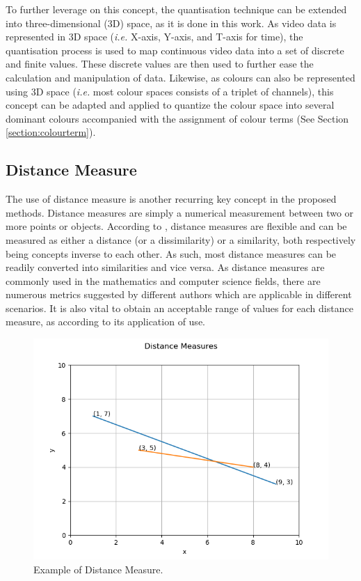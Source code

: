 To further leverage on this concept, the quantisation technique
can be extended into three-dimensional (3D) space, as it is done in this work. As video data is represented in 3D space (\emph{i.e.} X-axis, Y-axis, and T-axis for time), the quantisation process is used to map continuous video data into a set of discrete
and finite values. These discrete values are then used to further ease the
calculation and manipulation of data. Likewise, as colours can also be
represented using 3D space (\emph{i.e.} most colour spaces consists of a triplet of channels), this concept can be adapted and applied to quantize the colour space into several dominant colours accompanied
with the assignment of colour terms (See Section \ref{section:colourterm}).



\vspace{1em}
\subsection{Distance Measure}
\label{section:distancemeasures}

The use of distance measure is another recurring key concept in the proposed
methods. Distance measures are simply a numerical measurement between
two or more points or objects. According to \cite{mccune2002distance},
distance measures are flexible and can be measured as either a distance (or a dissimilarity)
or a similarity, both respectively being concepts inverse to each other. As such, most distance measures can be readily converted into
similarities and vice versa. 
As distance measures are commonly used in the mathematics and
computer science fields, there are numerous metrics suggested by different
authors which are applicable in different scenarios. It is also
vital to obtain an acceptable range of values for each distance measure, as according to its application of use.

\begin{figure}[hbt!]
 \centering
 \includegraphics[width=.7\textwidth]{image/general/distance.png}
 \caption{Example of Distance Measure.}
 \label{fig:distanceMeasure}
\end{figure}

